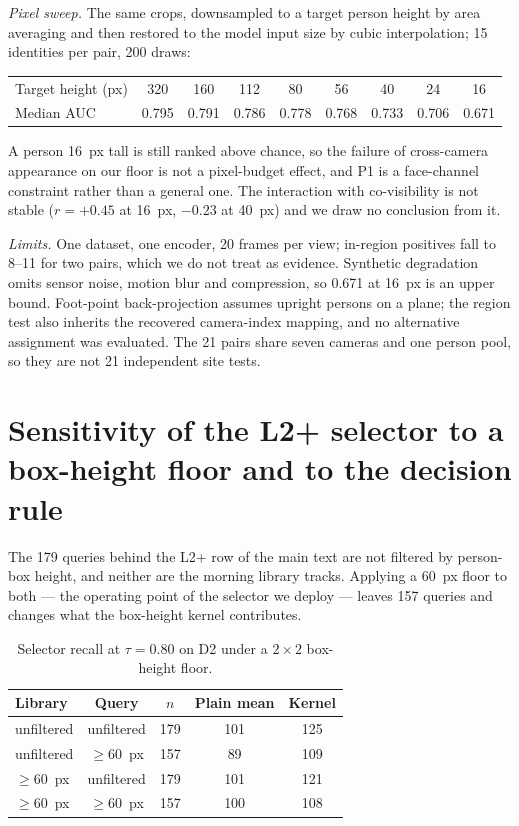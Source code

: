 \documentclass[10pt,a4paper]{article}
\begin{document}
\emph{Pixel sweep.} The same crops, downsampled to a target person height by area averaging and then restored to the model input size by cubic interpolation; 15 identities per pair, 200 draws:

\begin{center}
\small
\setlength{\tabcolsep}{4pt}
\begin{tabular}{@{}lcccccccc@{}}
\toprule
Target height (px) & 320 & 160 & 112 & 80 & 56 & 40 & 24 & 16\\
Median AUC & 0.795 & 0.791 & 0.786 & 0.778 & 0.768 & 0.733 & 0.706 & 0.671\\
\bottomrule
\end{tabular}
\end{center}

A person 16~px tall is still ranked above chance, so the failure of cross-camera appearance on our floor is not a pixel-budget effect, and P1 is a face-channel constraint rather than a general one. The interaction with co-visibility is not stable ($r=+0.45$ at 16~px, $-0.23$ at 40~px) and we draw no conclusion from it.

\emph{Limits.} One dataset, one encoder, 20 frames per view; in-region positives fall to 8--11 for two pairs, which we do not treat as evidence. Synthetic degradation omits sensor noise, motion blur and compression, so 0.671 at 16~px is an upper bound. Foot-point back-projection assumes upright persons on a plane; the region test also inherits the recovered camera-index mapping, and no alternative assignment was evaluated. The 21 pairs share seven cameras and one person pool, so they are not 21 independent site tests.

\section{Sensitivity of the L2+ selector to a box-height floor and to the decision rule}\label{sec:supp-sens}

The 179 queries behind the L2+ row of the main text are not filtered by person-box height, and neither are the morning library tracks. Applying a 60~px floor to both --- the operating point of the selector we deploy --- leaves 157 queries and changes what the box-height kernel contributes.

\begin{table}[h]
\centering
\caption{Selector recall at $\tau=0.80$ on D2 under a $2\times2$ box-height floor.}
\label{tab:sens}
\begin{tabular}{lcccc}
\toprule
Library & Query & $n$ & Plain mean & Kernel \\
\midrule
unfiltered & unfiltered & 179 & 101 & 125 \\
unfiltered & $\ge 60$~px & 157 & 89 & 109 \\
$\ge 60$~px & unfiltered & 179 & 101 & 121 \\
$\ge 60$~px & $\ge 60$~px & 157 & 100 & 108 \\
\bottomrule
\end{tabular}
\end{table}
\end{document}
